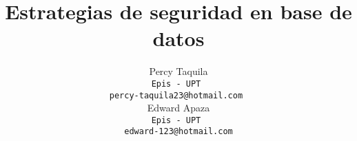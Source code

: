 \documentclass[11pt]{article}
\title{Estrategias de seguridad en base de datos}
\author{Percy Taquila\\
  {\tt Epis - UPT } \\
  {\tt percy-taquila23@hotmail.com } \\\And
  {Edward Apaza \\
  {\tt Epis - UPT } \\
  {\tt edward-123@hotmail.com}}}
\begin{document}
\maketitle
\date{}








\end{document}
